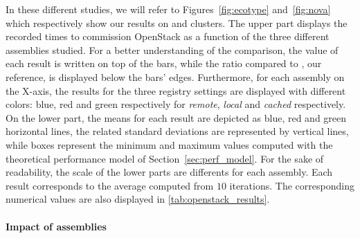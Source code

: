 In these different studies, we will refer to Figures~\ref{fig:ecotype}
and~\ref{fig:nova} which respectively show our results on \ecotype and
\nova clusters. The upper part displays the recorded times to
commission OpenStack as a function of the three different assemblies
studied. For a better understanding of the comparison, the value of
each result is written on top of the bars, while the ratio compared to
\ansass, our reference, is displayed below the bars' edges.
Furthermore, for each assembly on the X-axis, the results for the
three \docker registry settings are displayed with different colors:
blue, red and green respectively for \emph{remote}, \emph{local} and
\emph{cached} respectively. On the lower part, the means for each
result are depicted as blue, red and green horizontal lines, the
related standard deviations are represented by vertical lines, while
boxes represent the minimum and maximum values computed with the
theoretical performance model of Section~\ref{sec:perf_model}.
% 
For the sake of readability, the scale of the lower parts are
differents for each assembly. Each result corresponds to the average
computed from $10$ iterations. The corresponding numerical values are
also displayed in \cref{tab:openstack_results}.
%

\paragraph{Impact of assemblies}

